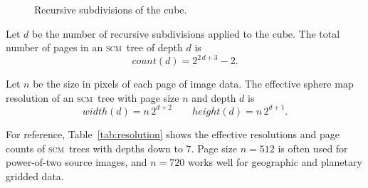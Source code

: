 \documentclass[oneside,10pt]{memoir}
\newcommand{\scm}     {\textsc{scm}}
\newcommand{\scmcount} [1]{\ensuremath{\mathit{count}(#1)}}
\newcommand{\scmwidth} [1]{\ensuremath{\mathit{width}(#1)}}
\newcommand{\scmheight}[1]{\ensuremath{\mathit{height}(#1)}}
\begin{document}
\begin{Spacing}{1.1}
\begin{figure}
  \centering
  \hfil
  \caption{Recursive subdivisions of the cube.}
  \label{fig:subdivision}
\end{figure}

Let $d$ be the number of recursive subdivisions applied to the cube. The total number of pages in an \scm\ tree of depth $d$ is
\[\scmcount{d}=2^{2\,d+3}-2.\]

Let $n$ be the size in pixels of each page of image data. The effective sphere map resolution of an \scm\ tree with page size $n$ and depth $d$ is
\[\scmwidth{d}=n\,2^{d+2}\qquad \scmheight{d}=n\,2^{d+1}.\]

For reference, Table~\ref{tab:resolution} shows the effective resolutions and page counts of \scm\ trees with depths down to $7$. Page size $n=512$ is often used for power-of-two source images, and $n=720$ works well for geographic and planetary gridded data.


\end{Spacing}
\end{document}
